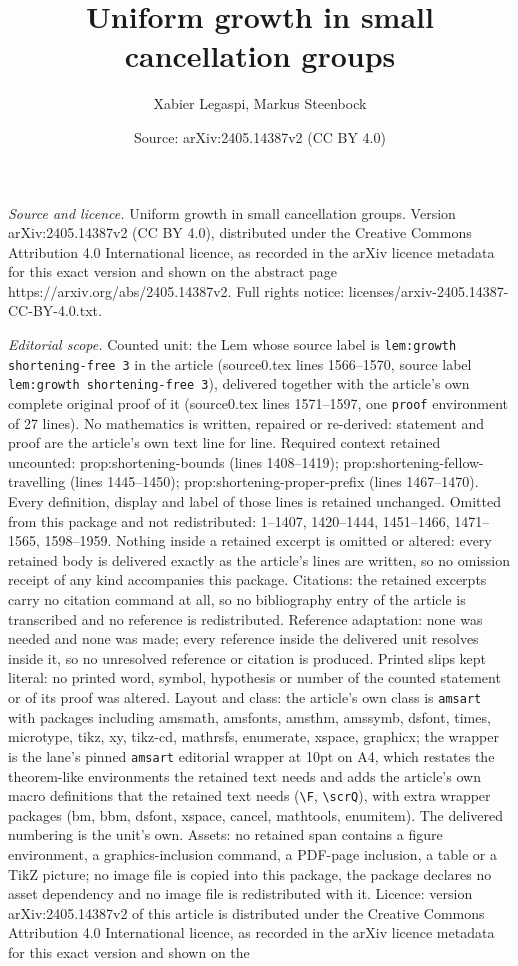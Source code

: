 \documentclass[10pt,a4paper]{amsart}
\title[Uniform growth in small cancellation groups]{Uniform growth in small cancellation groups}
\author{Xabier Legaspi, Markus Steenbock}
\date{Source: arXiv:2405.14387v2 (CC BY 4.0)}
\begin{document}
\maketitle

\noindent\emph{Source and licence.} Uniform growth in small cancellation groups. Version arXiv:2405.14387v2 (CC BY 4.0), distributed under the Creative Commons Attribution 4.0 International licence, as recorded in the arXiv licence metadata for this exact version and shown on the abstract page https://arxiv.org/abs/2405.14387v2. Full rights notice: licenses/arxiv-2405.14387-CC-BY-4.0.txt.\par\smallskip

\noindent\textit{Editorial scope.} Counted unit: the Lem whose source label is \texttt{lem:growth shortening-free 3} in the article (source0.tex lines 1566--1570, source label \texttt{lem:growth shortening-free 3}), delivered together with the article's own complete original proof of it (source0.tex lines 1571--1597, one \texttt{proof} environment of 27 lines). No mathematics is written, repaired or re-derived: statement and proof are the article's own text line for line. Required context retained uncounted: prop:shortening-bounds (lines 1408--1419); prop:shortening-fellow-travelling (lines 1445--1450); prop:shortening-proper-prefix (lines 1467--1470). Every definition, display and label of those lines is retained unchanged. Omitted from this package and not redistributed: 1--1407, 1420--1444, 1451--1466, 1471--1565, 1598--1959. Nothing inside a retained excerpt is omitted or altered: every retained body is delivered exactly as the article's lines are written, so no omission receipt of any kind accompanies this package. Citations: the retained excerpts carry no citation command at all, so no bibliography entry of the article is transcribed and no reference is redistributed. Reference adaptation: none was needed and none was made; every reference inside the delivered unit resolves inside it, so no unresolved reference or citation is produced. Printed slips kept literal: no printed word, symbol, hypothesis or number of the counted statement or of its proof was altered. Layout and class: the article's own class is \texttt{amsart} with packages including amsmath, amsfonts, amsthm, amssymb, dsfont, times, microtype, tikz, xy, tikz-cd, mathrsfs, enumerate, xspace, graphicx; the wrapper is the lane's pinned \texttt{amsart} editorial wrapper at 10pt on A4, which restates the theorem-like environments the retained text needs and adds the article's own macro definitions that the retained text needs (\texttt{\textbackslash F}, \texttt{\textbackslash scrQ}), with extra wrapper packages (bm, bbm, dsfont, xspace, cancel, mathtools, enumitem). The delivered numbering is the unit's own. Assets: no retained span contains a figure environment, a graphics-inclusion command, a PDF-page inclusion, a table or a TikZ picture; no image file is copied into this package, the package declares no asset dependency and no image file is redistributed with it. Licence: version arXiv:2405.14387v2 of this article is distributed under the Creative Commons Attribution 4.0 International licence, as recorded in the arXiv licence metadata for this exact version and shown on the 
\end{document}
